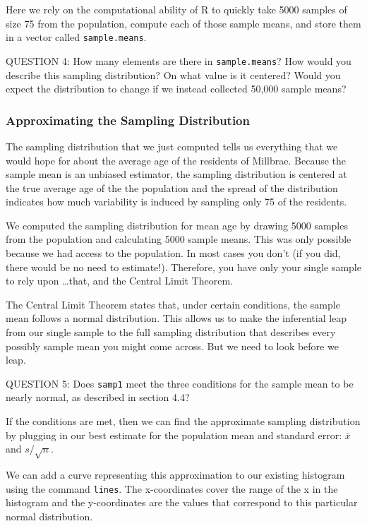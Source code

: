 \documentclass[11pt]{article}
\begin{document}
Here we rely on the computational ability of R to quickly take 5000 samples of size 75 from the population, compute each of those sample means, and store them in a vector called \texttt{sample.means}.

\bigskip
QUESTION 4: How many elements are there in \texttt{sample.means}?  How would you describe this sampling distribution?  On what value is it centered?  Would you expect the distribution to change if we instead collected 50,000 sample means?

\subsubsection*{Approximating the Sampling Distribution}
The sampling distribution that we just computed tells us everything that we would hope for about the average age of the residents of Millbrae.  Because the sample mean is an unbiased estimator, the sampling distribution is centered at the true average age of the the population and the spread of the distribution indicates how much variability is induced by sampling only 75 of the residents.

We computed the sampling distribution for mean age by drawing 5000 samples from the population and calculating 5000 sample means.  This was only possible because we had access to the population.  In most cases you don't (if you did, there would be no need to estimate!).  Therefore, you have only your single sample to rely upon \ldots that, and the Central Limit Theorem.

The Central Limit Theorem states that, under certain conditions, the sample mean follows a normal distribution.  This allows us to make the inferential leap from our single sample to the full sampling distribution that describes every possibly sample mean you might come across.  But we need to look before we leap.

\bigskip
QUESTION 5: Does \texttt{samp1} meet the three conditions for the sample mean to be nearly normal, as described in section 4.4?
\bigskip

If the conditions are met, then we can find the approximate sampling distribution by plugging in our best estimate for the population mean and standard error: $\bar{x}$ and $s/\sqrt{n}$.  


We can add a curve representing this approximation to our existing histogram using the command \texttt{lines}.  The x-coordinates cover the range of the x in the histogram and the y-coordinates are the values that correspond to this particular normal distribution.
\end{document}
